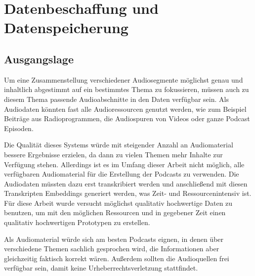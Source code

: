\chapter{Datenbeschaffung und Datenspeicherung}\label{ch:data}

\section{Ausgangslage}

Um eine Zusammenstellung verschiedener Audiosegmente möglichst genau und inhaltlich abgestimmt auf ein bestimmtes Thema zu fokussieren, müssen auch zu diesem Thema passende Audioabschnitte in den Daten verfügbar sein.
Als Audiodaten könnten fast alle Audioressourcen genutzt werden, wie zum Beispiel Beiträge aus Radioprogrammen, die Audiospuren von Videos oder ganze Podcast Episoden.

Die Qualität dieses Systems würde mit steigender Anzahl an Audiomaterial bessere Ergebnisse erzielen, da dann zu vielen Themen mehr Inhalte zur Verfügung stehen.
Allerdings ist es im Umfang dieser Arbeit nicht möglich, alle verfügbaren Audiomaterial für die Erstellung der Podcasts zu verwenden.
Die Audiodaten müssten dazu erst transkribiert werden und anschließend mit diesen Transkripten Embeddings generiert werden, was Zeit- und Ressourcenintensiv ist.
Für diese Arbeit wurde versucht möglichst qualitativ hochwertige Daten zu benutzen, um mit den möglichen Ressourcen und in gegebener Zeit einen qualitativ hochwertigen Prototypen zu erstellen. 

Als Audiomaterial würde sich am besten Podcasts eignen, in denen über verschiedene Themen sachlich gesprochen wird, die Informationen aber gleichzeitig faktisch korrekt wären.
Außerdem sollten die Audioquellen frei verfügbar sein, damit keine Urheberrechtsverletzung stattfindet.







